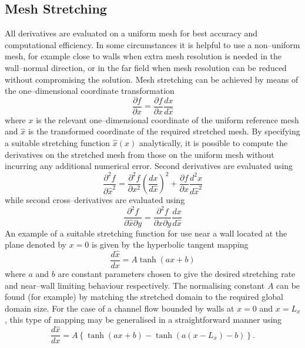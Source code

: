 \documentclass[dvips]{article}
\begin{document}
\subsection{Mesh Stretching}
All derivatives are evaluated on a uniform mesh for best accuracy and
computational efficiency.  In some circumstances it is helpful to use a
non--uniform mesh, for example close to walls when extra mesh resolution is
needed in the wall--normal direction, or in the far field when mesh
resolution can be reduced without compromising the solution.  Mesh
stretching can be achieved by means of the one--dimensional coordinate
transformation
\begin{equation}
\frac{\partial f}{\partial \hat{x}} = 
\frac{\partial f}{\partial x}\frac{dx}{d\hat{x}}
\end{equation}
where $x$ is the relevant one--dimensional coordinate of the uniform
reference mesh and $\hat{x}$ is the transformed coordinate of the
required stretched mesh.  By specifying a suitable stretching function
$\hat{x}(x)$ analytically, it is possible to compute the derivatives on the
stretched mesh from those on the uniform mesh without incurring any
additional numerical error.  Second derivatives are evaluated using
\begin{equation}
\frac{\partial^{2} f}{\partial \hat{x}^{2}} = 
\frac{\partial^{2} f}{\partial x^{2}}
\left(\frac{dx}{d\hat{x}}\right)^{2} +
\frac{\partial f}{\partial x}\frac{d^{2}x}{d\hat{x}^{2}}
\end{equation}
while second cross--derivatives are evaluated using
\begin{equation}
\frac{\partial^{2} f}{\partial \hat{x}\partial y} = 
\frac{\partial^{2} f}{\partial x\partial y}\frac{dx}{d\hat{x}}
\end{equation}
An example of a suitable stretching function for use near a wall located
at the plane denoted by $x = 0$ is given by the hyperbolic tangent
mapping
\begin{equation}
\frac{d\hat{x}}{dx} = A\tanh{\left(ax + b\right)}
\end{equation}
where $a$ and $b$ are constant parameters chosen to give the desired stretching
rate and near--wall limiting behaviour respectively.  The normalising
constant $A$ can be found (for example) by matching the stretched domain to
the required global domain size.  For the case of a channel flow bounded by
walls at $x = 0$ and $x = L_{x}$, this type of mapping may be generalised in a
straightforward manner using
\begin{equation}
\frac{d\hat{x}}{dx} = A\left\{\tanh{\left(ax + b\right)}
-\tanh{\left(a(x-L_{x}) - b\right)}\right\}.
\end{equation}
\end{document}

